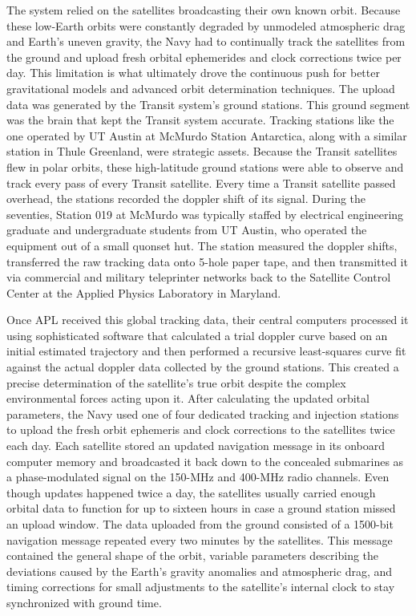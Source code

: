 The system relied on the satellites broadcasting their own known orbit. Because these low-Earth orbits were constantly degraded by unmodeled atmospheric drag and Earth's uneven gravity, the Navy had to continually track the satellites from the ground and upload fresh orbital ephemerides and clock corrections twice per day. This limitation is what ultimately drove the continuous push for better gravitational models and advanced orbit determination techniques. The upload data was generated by the Transit system’s ground stations. This ground segment was the brain that kept the Transit system accurate. Tracking stations like the one operated by UT Austin at McMurdo Station Antarctica, along with a similar station in Thule Greenland, were strategic assets. Because the Transit satellites flew in polar orbits, these high-latitude ground stations were able to observe and track every pass of every Transit satellite. Every time a Transit satellite passed overhead, the stations recorded the doppler shift of its signal. During the seventies, Station 019 at McMurdo was typically staffed by electrical engineering graduate and undergraduate students from UT Austin, who operated the equipment out of a small quonset hut. The station measured the doppler shifts, transferred the raw tracking data onto 5-hole paper tape, and then transmitted it via commercial and military teleprinter networks back to the Satellite Control Center at the Applied Physics Laboratory in Maryland.

Once APL received this global tracking data, their central computers processed it using sophisticated software that calculated a trial doppler curve based on an initial estimated trajectory and then performed a recursive least-squares curve fit against the actual doppler data collected by the ground stations. This created a precise determination of the satellite's true orbit despite the complex environmental forces acting upon it. After calculating the updated orbital parameters, the Navy used one of four dedicated tracking and injection stations to upload the fresh orbit ephemeris and clock corrections to the satellites twice each day. Each satellite stored an updated navigation message in its onboard computer memory and broadcasted it back down to the concealed submarines as a phase-modulated signal on the 150-MHz and 400-MHz radio channels. Even though updates happened twice a day, the satellites usually carried enough orbital data to function for up to sixteen hours in case a ground station missed an upload window. The data uploaded from the ground consisted of a 1500-bit navigation message repeated every two minutes by the satellites. This message contained the general shape of the orbit, variable parameters describing the deviations caused by the Earth’s gravity anomalies and atmospheric drag, and timing corrections for small adjustments to the satellite's internal clock to stay synchronized with ground time. 

